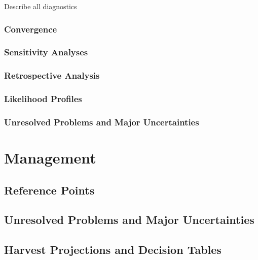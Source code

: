 \documentclass[11pt,
  english,
  letterpaper,
]{article}
\begin{document}
Describe all diagnostics

\hypertarget{convergence}{%
\subsubsection{Convergence}\label{convergence}}

\hypertarget{sensitivity-analyses}{%
\subsubsection{Sensitivity Analyses}\label{sensitivity-analyses}}

\hypertarget{retrospective-analysis}{%
\subsubsection{Retrospective Analysis}\label{retrospective-analysis}}

\hypertarget{likelihood-profiles}{%
\subsubsection{Likelihood Profiles}\label{likelihood-profiles}}

\hypertarget{unresolved-problems-and-major-uncertainties-1}{%
\subsubsection{Unresolved Problems and Major Uncertainties}\label{unresolved-problems-and-major-uncertainties-1}}

\hypertarget{management}{%
\section{Management}\label{management}}

\hypertarget{reference-points-2}{%
\subsection{Reference Points}\label{reference-points-2}}

\hypertarget{unresolved-problems-and-major-uncertainties-2}{%
\subsection{Unresolved Problems and Major Uncertainties}\label{unresolved-problems-and-major-uncertainties-2}}

\hypertarget{harvest-projections-and-decision-tables}{%
\subsection{Harvest Projections and Decision Tables}\label{harvest-projections-and-decision-tables}}
\end{document}
